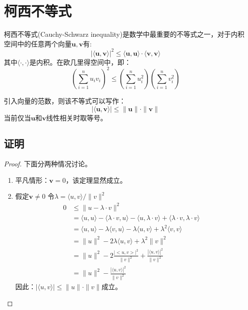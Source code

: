 \documentclass[a4paper]{article} %
\numberwithin{equation}{section} %
\begin{document}
\section{柯西不等式}

柯西不等式(Cauchy-Schwarz inequality)是数学中最重要的不等式之一，对于内积空间中的任意两个向量$\mathbf u,\mathbf v$有:
\begin{equation}
|\langle \mathbf u,\mathbf v\rangle|^2\le \langle \mathbf u,\mathbf u\rangle \cdot\langle \mathbf v,\mathbf v\rangle
\end{equation}
其中$\langle\cdot,\cdot\rangle$是内积。在欧几里得空间中，即：
\begin{equation}
\left(\sum _{i=1}^{n}u_{i}v_{i}\right)^{2}\leq \left(\sum _{i=1}^{n}u_{i}^{2}\right)\left(\sum _{i=1}^{n}v_{i}^{2}\right)
\end{equation}


引入向量的范数，则该不等式可以写作：
\begin{equation}
|\langle\mathbf u,\mathbf v\rangle|\le \|\mathbf u\|\cdot\|\mathbf v\|
\end{equation}
当前仅当$\mathbf u$和$\mathbf v$线性相关时取等号。

\subsection{证明}

\begin{proof}
下面分两种情况讨论。

\begin{enumerate}[1$^\circ$]
\item 平凡情形：$\mathbf v=0$，该定理显然成立。
\item 假定$\mathbf v\neq 0$ 令$\lambda=\langle u,v\rangle/\|v\|^2$
\begin{align}
0 &\le \|u-\lambda\cdot v\|^2 \\
&=\langle u,u\rangle-\langle\lambda\cdot v,u\rangle-\langle u,\lambda\cdot v\rangle+\langle\lambda\cdot v,\lambda\cdot v\rangle \\
&=\langle u,u\rangle-\lambda\langle v,u\rangle-\lambda\langle u,v \rangle+\lambda^2\langle v,v\rangle \\
&=\|u\|^2-2\lambda\langle u,v\rangle+\lambda^2\|v\|^2 \\
&=\|u\|^2-2\frac{|<u,v>|^2}{\|v\|^2}+\frac{|\langle u,v\rangle|^2}{\|v\|^2} \\
&=\|u\|^2-\frac{|\langle u,v\rangle|^2}{\|v\|^2}
\end{align}
因此：$|\langle u,v\rangle |\le \|u\|\cdot\|v\|$成立。
\end{enumerate}
\end{proof}
\end{document}
